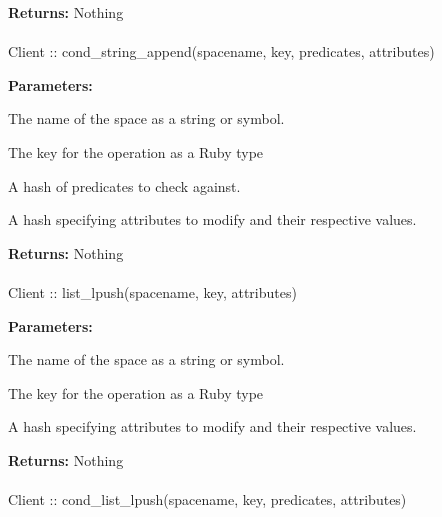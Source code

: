 \noindent\textbf{Returns:}
Nothing

\paragraph{}
\begin{ccode}
Client :: cond_string_append(spacename, key, predicates, attributes)
\end{ccode}
\funcdesc 

\noindent\textbf{Parameters:}
\begin{description}[labelindent=\widthof{{predicates}},leftmargin=*,noitemsep,nolistsep,align=right]
\item[spacename] The name of the space as a string or symbol.
\item[key] The key for the operation as a Ruby type
\item[predicates] A hash of predicates to check against.
\item[attributes] A hash specifying attributes to modify and their respective values.
\end{description}

\noindent\textbf{Returns:}
Nothing

\paragraph{}
\begin{ccode}
Client :: list_lpush(spacename, key, attributes)
\end{ccode}
\funcdesc 

\noindent\textbf{Parameters:}
\begin{description}[labelindent=\widthof{{attributes}},leftmargin=*,noitemsep,nolistsep,align=right]
\item[spacename] The name of the space as a string or symbol.
\item[key] The key for the operation as a Ruby type
\item[attributes] A hash specifying attributes to modify and their respective values.
\end{description}

\noindent\textbf{Returns:}
Nothing

\paragraph{}
\begin{ccode}
Client :: cond_list_lpush(spacename, key, predicates, attributes)
\end{ccode}
\funcdesc 

